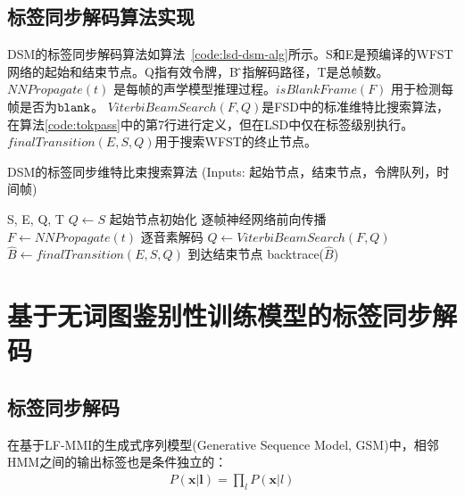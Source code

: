 \subsection{标签同步解码算法实现}
\label{chap:lsd-lsd-ctc-alg}

DSM的标签同步解码算法如算法~\ref{code:lsd-dsm-alg}所示。S和E是预编译的WFST网络的起始和结束节点。Q指有效令牌，B ̂指解码路径，T是总帧数。$NNPropagate(t)$ 是每帧的声学模型推理过程。$isBlankFrame(F)$ 用于检测每帧是否为$\tt blank$。 $ViterbiBeamSearch(F, Q)$是FSD中的标准维特比搜索算法，在算法\ref{code:tokpass}中的第7行进行定义，但在LSD中仅在标签级别执行。  $finalTransition(E,S,Q)$用于搜索WFST的终止节点\cite{hori2007efficient}。


\begin{algorithm}[ht]
\caption{DSM的标签同步维特比束搜索算法 \textcolor[rgb]{0,0.5,0}{(Inputs: 起始节点，结束节点，令牌队列，时间帧)}}
\label{code:lsd-dsm-alg}
\begin{algorithmic}[1]
 {S, E, Q, T}
\State $Q \leftarrow S$ \Comment \textcolor[rgb]{0,0.5,0}{起始节点初始化}
    \Comment \textcolor[rgb]{0,0.5,0}{逐帧神经网络前向传播}
\State $F \leftarrow NNPropagate(t)$
   \Comment \textcolor[rgb]{0,0.5,0}{逐音素解码}
\State  $Q\leftarrow ViterbiBeamSearch(F, Q)$
\EndIf
\EndFor
\State $\hat B\leftarrow finalTransition(E,S,Q)$ \Comment \textcolor[rgb]{0,0.5,0}{到达结束节点}
\State backtrace($\hat B$)
\EndProcedure
\end{algorithmic}
\end{algorithm}


\section{基于无词图鉴别性训练模型的标签同步解码}
\label{chap:lsd-lfmmi}

\subsection{标签同步解码}
\label{chap:lsd-lsd-hmm}

在基于LF-MMI的生成式序列模型(Generative Sequence Model, GSM)中，相邻HMM之间的输出标签也是条件独立的：
\begin{equation} \label{eq:viterbi-blk-hmm}
  \begin{split}
        P(\mathbf{x}|\mathbf{l}) 
        = \prod_{l} P(\mathbf{x}|l) \end{split}
       \end{equation}

